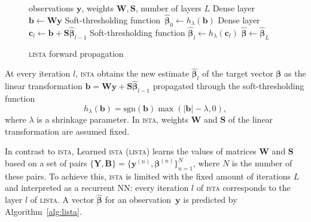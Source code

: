 \documentclass{article}
\begin{document}
 \begin{figure}  
 \vspace{-10pt}
\begin{minipage}{0.5\textwidth}
  \begin{algorithm}[H]
    \caption{\textsc{lista} forward propagation}
\label{alg:lista}   
    \begin{algorithmic}[1]
      \REQUIRE observations $\mathbf{y}$, weights $\mathbf{W}, \mathbf{S}$, number of layers $L$
      \STATE Dense layer $\mathbf{b} \gets \mathbf{W}\mathbf{y}$ \label{eq:first_layer}
      \STATE Soft-thresholding function~$\widehat{\boldsymbol\beta}_0 \gets h_\lambda(\mathbf{b})$ \label{eq:thr_first}
        \STATE Dense layer $\mathbf{c}_l \gets \mathbf{b} + \mathbf{S}\widehat{\boldsymbol\beta}_{l-1}$ \label{eq:l_dense_layer}
        \STATE Soft-thresholding function $\widehat{\boldsymbol\beta}_{l} \gets h_\lambda(\mathbf{c}_l)$ \label{eq:l_thr}
      \ENDFOR
      \RETURN $\widehat{\boldsymbol\beta} \gets \widehat{\boldsymbol\beta}_{L}$
    \end{algorithmic}
  \end{algorithm}
\end{minipage}
\end{figure}  
At every iteration $l$, \textsc{ista} obtains the new estimate $\widehat{\boldsymbol\beta}_l$ of the target vector $\boldsymbol\beta$ as the linear transformation $\mathbf{b} = \mathbf{W}\mathbf{y} + \mathbf{S}\widehat{\boldsymbol\beta}_{l-1}$ propagated through the soft-thresholding function %
  \begin{equation}
  h_\lambda(\mathbf{b}) = \text{sgn}(\mathbf{b}) \max(|\mathbf{b}| - \lambda, 0),
  \end{equation}
  where $\lambda$ is a shrinkage parameter.
  In \textsc{ista}, weights $\mathbf{W}$ and $\mathbf{S}$ of the linear transformation are assumed fixed.
   
In contrast to \textsc{ista}, Learned \textsc{ista} (\textsc{lista}) \cite{gregor2010learning} learns the values of matrices $\mathbf{W}$ and $\mathbf{S}$ based on a set of pairs $\{\mathbf{Y}, \mathbf{B}\}=\{\mathbf{y}^{(n)}, \boldsymbol\beta^{(n)}\}_{n=1}^N$, where $N$ is the number of these pairs. To achieve this, \textsc{ista} is limited with the fixed amount of iterations $L$ and interpreted as a recurrent NN: every iteration $l$ of \textsc{ista} corresponds to the layer $l$ of \textsc{lista}. A vector $\widehat{\boldsymbol\beta}$ for an observation~$\mathbf{y}$ is predicted by Algorithm~\ref{alg:lista}.
\end{document}
